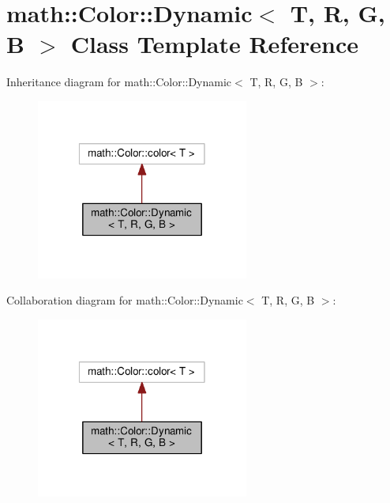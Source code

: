 \hypertarget{classmath_1_1Color_1_1Dynamic}{\section{math\-:\-:Color\-:\-:Dynamic$<$ T, R, G, B $>$ Class Template Reference}
\label{classmath_1_1Color_1_1Dynamic}
}


Inheritance diagram for math\-:\-:Color\-:\-:Dynamic$<$ T, R, G, B $>$\-:
\nopagebreak
\begin{figure}[H]
\begin{center}
\leavevmode
\includegraphics[width=198pt]{classmath_1_1Color_1_1Dynamic__inherit__graph}
\end{center}
\end{figure}


Collaboration diagram for math\-:\-:Color\-:\-:Dynamic$<$ T, R, G, B $>$\-:
\nopagebreak
\begin{figure}[H]
\begin{center}
\leavevmode
\includegraphics[width=198pt]{classmath_1_1Color_1_1Dynamic__coll__graph}
\end{center}
\end{figure}
